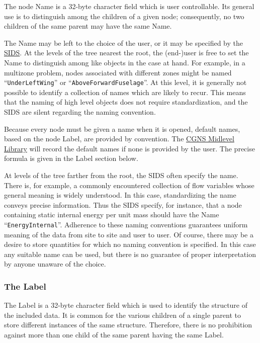 The node Name is a 32-byte character field which is user
controllable. Its general use is to distinguish among the children of a
given node; consequently, no two children of the same parent may have
the same Name.

The Name may be left to the choice of the user, or it may be
specified by the \href{../sids/sids.pdf}{SIDS}.
At the levels of the tree nearest the root,
the (end-)user is free to set the Name to distinguish among like
objects in the case at hand. For example, in a multizone problem, nodes
associated with different zones might be named ``\texttt{UnderLeftWing}''
or ``\texttt{AboveForwardFuselage}''. At this level, it is generally
not possible to identify a collection of names which are likely to
recur. This means that the naming of high level objects does not
require standardization, and the SIDS are silent regarding the naming
convention.

Because every node must be given a name when it is opened, default
names, based on the node Label, are provided by convention.
The \href{../midlevel/midlevel.pdf}{CGNS Midlevel Library} will
record the default names if none is provided by the user.
The precise formula is given in the Label section below.

At levels of the tree farther from the root, the SIDS often specify
the name. There is, for example, a commonly encountered collection of
flow variables whose general meaning is widely understood. In this
case, standardizing the name conveys precise information. Thus the SIDS
specify, for instance, that a node containing static internal energy
per unit mass should have the Name ``\texttt{EnergyInternal}''.
Adherence to these naming
conventions guarantees uniform meaning of the data from site to site
and user to user.
Of course, there may be a desire to store quantities for which no naming
convention is specified.
In this case any suitable name can be used, but there is no guarantee of
proper interpretation by anyone unaware of the choice.

\subsubsection{The Label}

The Label is a 32-byte character field which is used
to identify the structure of the included data.
It is common for the various
children of a single parent to store different instances of the same
structure. Therefore, there is no prohibition against more than one
child of the same parent having the same Label.


